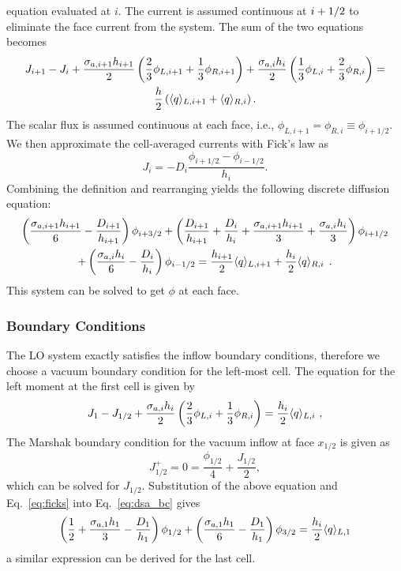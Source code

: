 equation evaluated at $i$.  The current is assumed continuous at ${i+1/2}$ to eliminate
the face current from the system.  The sum of the two equations becomes
\begin{multline}
    J_{i+1} - J_{i} + \frac{\sigma_{a,i+1} h_{i+1}}{2}\left(\frac{2}{3} \phi_{L,i+1} +
    \frac{1}{3}\phi_{R,i+1}\right) + \frac{\sigma_{a,i} h_i}{2} \left( \frac{1}{3} \phi_{L,i} +
    \frac{2}{3}\phi_{R,i}\right) =\\ \frac{h}{2} \left(\langle q \rangle_{L,i+1} + \langle q \rangle_{R,i}
    \right).
\end{multline}
The scalar flux is assumed continuous at each face, i.e., $\phi_{L,i+1} = \phi_{R,i}
\equiv \phi_{i+1/2}$.  We then approximate the cell-averaged currents with Fick's law
as \begin{equation}\label{eq:ficks}
    J_{i} = -D_i \frac{\phi_{i+1/2} - \phi_{i-1/2}}{h_i}.
\end{equation}
Combining the definition and rearranging yields the following discrete diffusion
equation:
\begin{multline}
        \left(\frac{\sigma_{a,i+1} h_{i+1}}{6} -
        \frac{D_{i+1}}{h_{i+1}}\right)\phi_{i+3/2} + \left(\frac{D_{i+1}}{h_{i+1}} +
        \frac{D_{i}}{h_i} + \frac{\sigma_{a,i+1} h_{i+1}}{3} + \frac{\sigma_{a,i}
        h_{i}}{3}\right)\phi_{i+1/2} \\ + \left(\frac{\sigma_{a,i} h_{i}}{6} -
        \frac{D_{i}}{h_{i}}\right)\phi_{i-1/2} = \frac{h_{i+1}}{2} \langle q \rangle_{L,i+1} +
        \frac{h_{i}}{2}\langle q \rangle_{R,i}\;\,. 
\end{multline}
This system can be solved to get $\phi$ at each face.

\subsubsection{Boundary Conditions}

The LO system exactly satisfies the inflow boundary conditions, therefore we choose a
vacuum boundary condition for the left-most cell.  The equation for the left moment
at the first cell is given by
\begin{equation}\label{eq:dsa_bc}
    J_{1} - J_{1/2}  + \frac{\sigma_{a,i}h_i}{2} \left(\frac{2}{3} \phi_{L,i} + \frac{1}{3}
    \phi_{R,i} \right) = \frac{h_i}{2} \langle q \rangle_{L,i}\,\,,
\end{equation}
The Marshak boundary condition for the vacuum inflow at face $x_{1/2}$ is given as
\begin{equation}
    J^+_{1/2} = 0 = \frac{\phi_{1/2}}{4} + \frac{J_{1/2}}{2},
\end{equation}
which can be solved for $J_{1/2}$.  Substitution of the above equation and
Eq.~\eqref{eq:ficks} into Eq.~\eqref{eq:dsa_bc} gives 
\begin{equation}
    \left(\frac{1}{2}+ \frac{\sigma_{a,1}h_1}{3} - \frac{D_1}{h_1}\right)\phi_{1/2} +
    \left( \frac{\sigma_{a,1}{h_1}}{6} - \frac{D_1}{h_1}  \right)\phi_{3/2} =
    \frac{h_i}{2} \langle q \rangle_{L,1}
\end{equation}
a similar expression can be derived for the last cell.


